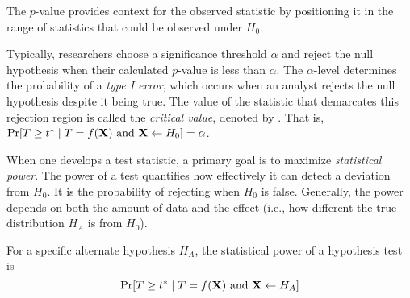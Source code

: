 The $p$-value provides context for the observed statistic by positioning it in the range of statistics that could be observed under $H_0$.

Typically, researchers choose a significance threshold $\alpha$ and reject the null hypothesis when their calculated $p$-value is less than $\alpha$. The $\alpha$-level determines the probability of a \textit{type I error}, which occurs when an analyst rejects the null hypothesis despite it being true. The value of the statistic that demarcates this rejection region is called the \emph{critical value}, denoted by \crit. That is, $\Pr[T\geq t^* \mid T = f(\mathbf{X}) \text{ and } \mathbf{X} \leftarrow H_0] = \alpha$.

When one develops a test statistic, a primary goal is to maximize \textit{statistical power}. The power of a test quantifies how effectively it can detect a deviation from $H_0$. It is the probability of rejecting when $H_0$ is false.  Generally, the power depends on both the amount of data and the effect (i.e., how different the true distribution $H_A$ is from $H_0$).

\begin{definition} \label{def:power}
For a specific alternate hypothesis $H_A$, the statistical power of a hypothesis test is 
\begin{equation*}
\Pr[T \geq t^* \mid T = f(\mathbf{X}) \text{ and } \mathbf{X} \leftarrow H_A]
\end{equation*}
\end{definition}



